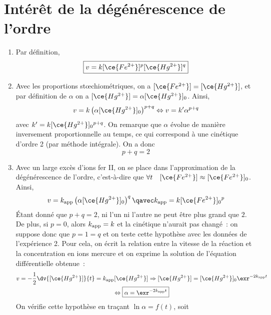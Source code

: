 \documentclass[a4paper, 12pt, final, garamond]{book}
\begin{document}
\section{Intérêt de la dégénérescence de l'ordre}
\begin{enumerate}
    \item Par définition,
        \[\boxed{v = k[\ce{Fe^{2+}}]^p[\ce{Hg^{2+}}]^q}\]
    \item Avec les proportions stœchiométriques, on a $[\ce{Fe^{2+}}] =
        [\ce{Hg^{2+}}]$, et par définition de $\alpha$ on a $[\ce{Hg^{2+}}] =
        \alpha[\ce{Hg^{2+}}]_0$. Ainsi,
        \begin{gather*}
            v = k \left( \alpha [\ce{Hg^{2+}}]_0\right)^{p+q}
            \Leftrightarrow
            v = k' \alpha^{p+q}
        \end{gather*}
        avec $k' = k[\ce{Hg^{2+}}]_0{}^{p+q}$. On remarque que $\alpha$
        évolue de manière inversement proportionnelle au temps, ce qui
        correspond à une cinétique d'ordre 2 (par méthode intégrale). On a donc
        \[\boxed{p+q = 2}\]
    \item Avec un large excès d'ions fer II, on se place dans l'approximation de
        la dégénérescence de l'ordre, c'est-à-dire que $\forall t\quad
        [\ce{Fe^{2+}}] \approx [\ce{Fe^{2+}}]_0$. Ainsi,
        \begin{gather*}
            v = k_{\rm app} \left( \alpha [\ce{Hg^{2+}}]_0 \right)^q
            \qavec
            k_{\rm app} = k [\ce{Fe^{2+}}]_0{}^p
        \end{gather*}
        Étant donné que $p+q = 2$, ni l'un ni l'autre ne peut être plus grand
        que $2$. De plus, si $p=0$, alors $k_{\rm app} = k$ et la cinétique
        n'aurait pas changé~: on suppose donc que $p=1=q$ et on teste cette
        hypothèse avec les données de l'expérience 2. Pour cela, on écrit la
        relation entre la vitesse de la réaction et la concentration en ions
        mercure et on exprime la solution de l'équation différentielle obtenue~:
        \begin{gather*}
            v = - \frac{1}{2} \dv{[\ce{Hg^{2+}}]}{t} = k_{\rm app} [\ce{Hg^{2+}}]
            \Rightarrow
            [\ce{Hg^{2+}}] = [\ce{Hg^{2+}}]_0 \exr^{-2k_{\rm app}t}\\
            \Leftrightarrow
            \boxed{
            \alpha = \exr^{-2k_{\rm app}t}}
        \end{gather*}
        On vérifie cette hypothèse en traçant $\ln \alpha = f(t)$, soit

\end{enumerate}
\end{document}
